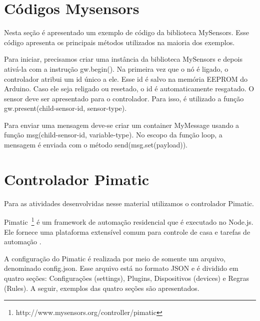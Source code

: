 \section{Códigos Mysensors}

Nesta seção é apresentado um exemplo de código da biblioteca MySensors. Esse código apresenta os principais métodos utilizados na maioria dos exemplos. 




Para iniciar, precisamos criar uma instância da biblioteca MySensors e depois ativá-la com a instrução gw.begin(). Na primeira vez que o nó é ligado, o controlador atribui um id único a ele. Esse id é salvo na memória EEPROM do Arduino. Caso ele seja religado ou resetado, o id é automaticamente resgatado. O sensor deve ser apresentado para o controlador. Para isso, é utilizado a função gw.present(child-sensor-id, sensor-type).

Para enviar uma mensagem deve-se criar um container MyMessage usando a função msg(child-sensor-id, variable-type). No escopo da função loop, a mensagem é enviada com o método send(msg.set(payload)).

\section{Controlador Pimatic}

Para as atividades desenvolvidas nesse material utilizamos o 
controlador Pimatic. 

Pimatic~\footnote{http://www.mysensors.org/controller/pimatic} é um framework de automação residencial que é executado no Node.js. Ele fornece uma plataforma extensível comum para controle de casa e tarefas de automação
\cite{pimatic}.

A configuração do Pimatic é realizada por meio de somente um arquivo, denominado config.json. Esse arquivo está no formato JSON e é dividido em quatro seções: Configurações (settings), Plugins, Dispositivos (devices) e Regras (Rules). A seguir, exemplos das quatro seções são apresentados.


